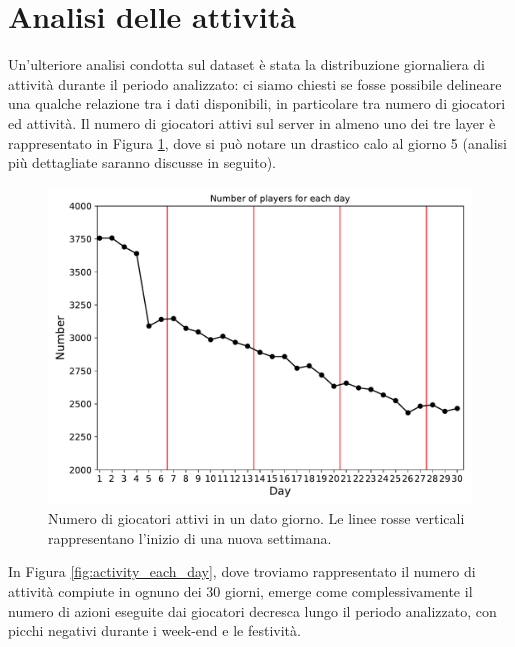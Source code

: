 \newpage 
\section{Analisi delle attività}
Un'ulteriore analisi condotta sul dataset è stata la distribuzione giornaliera di attività durante il periodo analizzato: ci siamo chiesti se fosse possibile delineare una qualche relazione tra i dati disponibili, in particolare tra numero di giocatori ed attività.
Il numero di giocatori attivi sul server in almeno uno dei tre layer è rappresentato in Figura \ref{fig:playereachday}, dove si può notare un drastico calo al giorno 5 (analisi più dettagliate saranno discusse in seguito).
\begin{figure}
	\centering
	\includegraphics[width=0.8\linewidth]{images/Activity/player_each_day}
	\caption{Numero di giocatori attivi in un dato giorno. Le linee rosse verticali rappresentano l'inizio di una nuova settimana.}
	\label{fig:playereachday}
\end{figure}
In Figura \ref{fig:activity_each_day}, dove troviamo rappresentato il numero di attività compiute in ognuno dei 30 giorni, emerge come complessivamente il numero di azioni eseguite dai giocatori decresca lungo il periodo analizzato, con picchi negativi durante i week-end e le festività. 
